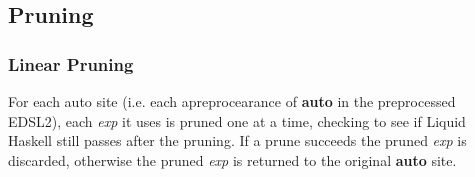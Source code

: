 \subsection{Pruning}

\subsubsection{Linear Pruning}

For each auto site (i.e. each apreprocearance of \textbf{auto} in the preprocessed EDSL2), each \textit{exp} it uses is pruned one at a time, checking to see if Liquid Haskell still passes after the pruning. If a prune succeeds the pruned \textit{exp} is discarded, otherwise the pruned \textit{exp} is returned to the original \textbf{auto} site.
